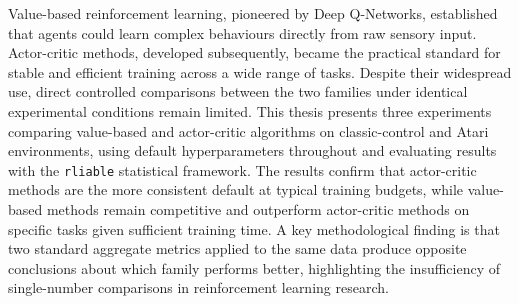 


\begin{abstracts}        %




{\color{red} 
Value-based reinforcement learning, pioneered by Deep Q-Networks, established that agents could learn complex behaviours directly from raw sensory input. Actor-critic methods, developed subsequently, became the practical standard for stable and efficient training across a wide range of tasks. Despite their widespread use, direct controlled comparisons between the two families under identical experimental conditions remain limited. This thesis presents three experiments comparing value-based and actor-critic algorithms on classic-control and Atari environments, using default hyperparameters throughout and evaluating results with the \texttt{rliable} statistical framework. The results confirm that actor-critic methods are the more consistent default at typical training budgets, while value-based methods remain competitive and outperform actor-critic methods on specific tasks given sufficient training time. A key methodological finding is that two standard aggregate metrics applied to the same data produce opposite conclusions about which family performs better, highlighting the insufficiency of single-number comparisons in reinforcement learning research.
}

\end{abstracts}



